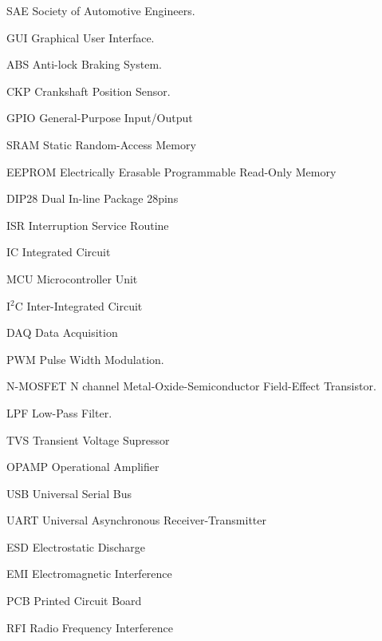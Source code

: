 \begin{siglas}
  \item[SAE] Society of Automotive Engineers.
  \item[GUI] Graphical User Interface.
  \item[ABS] Anti-lock Braking System.
  \item[CKP] Crankshaft Position Sensor.
  \item[GPIO] General-Purpose Input/Output
  \item[SRAM] Static Random-Access Memory
  \item[EEPROM] Electrically Erasable Programmable Read-Only Memory
  \item[DIP28] Dual In-line Package 28pins
  \item[ISR] Interruption Service Routine
  \item[IC] Integrated Circuit
  \item[MCU] Microcontroller Unit
  \item[I$^2$C] Inter-Integrated Circuit
  \item[DAQ] Data Acquisition
  \item[PWM] Pulse Width Modulation.
  \item[N-MOSFET] N channel Metal-Oxide-Semiconductor Field-Effect Transistor.
  \item[LPF] Low-Pass Filter.
  \item[TVS] Transient Voltage Supressor
  \item[OPAMP] Operational Amplifier
  \item[USB] Universal Serial Bus
  \item[UART] Universal Asynchronous Receiver-Transmitter
  \item[ESD] Electrostatic Discharge
  \item[EMI] Electromagnetic Interference
  \item[PCB] Printed Circuit Board
  \item[RFI] Radio Frequency Interference
\end{siglas}
